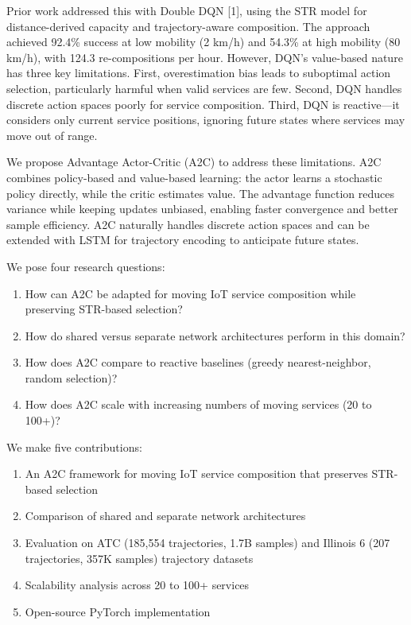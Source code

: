 \documentclass[
  10pt,
  twocolumn,
]{article}
\providecommand{\tightlist}{%
  \setlength{\itemsep}{0pt}\setlength{\parskip}{0pt}}
\begin{document}
Prior work addressed this with Double DQN {[}1{]}, using the STR model
for distance-derived capacity and trajectory-aware composition. The
approach achieved 92.4\% success at low mobility (2 km/h) and 54.3\% at
high mobility (80 km/h), with 124.3 re-compositions per hour. However,
DQN's value-based nature has three key limitations. First,
overestimation bias leads to suboptimal action selection, particularly
harmful when valid services are few. Second, DQN handles discrete action
spaces poorly for service composition. Third, DQN is reactive---it
considers only current service positions, ignoring future states where
services may move out of range.

We propose Advantage Actor-Critic (A2C) to address these limitations.
A2C combines policy-based and value-based learning: the actor learns a
stochastic policy directly, while the critic estimates value. The
advantage function reduces variance while keeping updates unbiased,
enabling faster convergence and better sample efficiency. A2C naturally
handles discrete action spaces and can be extended with LSTM for
trajectory encoding to anticipate future states.

We pose four research questions:

\begin{enumerate}
	\def\labelenumi{\arabic{enumi}.}
	\tightlist
	\item
	      How can A2C be adapted for moving IoT service composition while
	      preserving STR-based selection?
	\item
	      How do shared versus separate network architectures perform in this
	      domain?
	\item
	      How does A2C compare to reactive baselines (greedy nearest-neighbor,
	      random selection)?
	\item
	      How does A2C scale with increasing numbers of moving services (20 to
	      100+)?
\end{enumerate}

We make five contributions:

\begin{enumerate}
	\def\labelenumi{\arabic{enumi}.}
	\tightlist
	\item
	      An A2C framework for moving IoT service composition that preserves
	      STR-based selection
	\item
	      Comparison of shared and separate network architectures
	\item
	      Evaluation on ATC (185,554 trajectories, 1.7B samples) and Illinois 6
	      (207 trajectories, 357K samples) trajectory datasets
	\item
	      Scalability analysis across 20 to 100+ services
	\item
	      Open-source PyTorch implementation
\end{enumerate}
\end{document}
